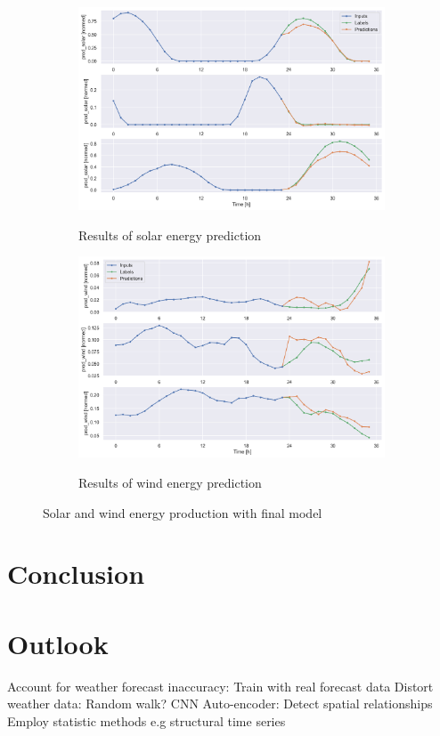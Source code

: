 \documentclass[11pt,table]{article}
\begin{document}
\begin{figure}[H]
\centering
\begin{subfigure}{.5\textwidth}
  \centering
  \includegraphics[width=0.9\linewidth]{Figures/solarResults.png}
  \label{fig:fourierWind}
  \caption{Results of solar energy prediction}
\end{subfigure}%
\begin{subfigure}{.5\textwidth}
  \centering
  \includegraphics[width=0.9\linewidth]{Figures/windResults.png}
  \label{fig:fourierSolar}
  \caption{Results of wind energy prediction}
\end{subfigure}
\caption{Solar and wind energy production with final model}
\label{fig:fourier}
\end{figure}

\section{Conclusion}
\section{Outlook}
Account for weather forecast inaccuracy:
Train with real forecast data
Distort weather data: Random walk?
CNN Auto-encoder: Detect spatial relationships
Employ statistic methods
e.g structural time series
\end{document}
